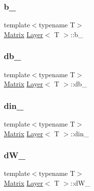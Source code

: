 \subsubsection{\texorpdfstring{b\_}{b\_}}
{\footnotesize\ttfamily template$<$typename T$>$ \\
\mbox{\hyperlink{class_layer_a22b1e7286096aa62bd245536c8ebdaf1}{Matrix}} \mbox{\hyperlink{class_layer}{Layer}}$<$ T $>$\+::b\+\_\+\hspace{0.3cm}{\ttfamily [protected]}}

\mbox{\label{class_layer_a4ff69fa1c45333cbef24f12d190f26a5}} 
\subsubsection{\texorpdfstring{db\_}{db\_}}
{\footnotesize\ttfamily template$<$typename T$>$ \\
\mbox{\hyperlink{class_layer_a22b1e7286096aa62bd245536c8ebdaf1}{Matrix}} \mbox{\hyperlink{class_layer}{Layer}}$<$ T $>$\+::db\+\_\+\hspace{0.3cm}{\ttfamily [protected]}}

\mbox{\label{class_layer_adcac12db650e05e0e5c664c304231604}} 
\subsubsection{\texorpdfstring{din\_}{din\_}}
{\footnotesize\ttfamily template$<$typename T$>$ \\
\mbox{\hyperlink{class_layer_a22b1e7286096aa62bd245536c8ebdaf1}{Matrix}} \mbox{\hyperlink{class_layer}{Layer}}$<$ T $>$\+::din\+\_\+\hspace{0.3cm}{\ttfamily [protected]}}

\mbox{\label{class_layer_ab02d1e3e853bef3aadffc312ba847f44}} 
\subsubsection{\texorpdfstring{dW\_}{dW\_}}
{\footnotesize\ttfamily template$<$typename T$>$ \\
\mbox{\hyperlink{class_layer_a22b1e7286096aa62bd245536c8ebdaf1}{Matrix}} \mbox{\hyperlink{class_layer}{Layer}}$<$ T $>$\+::d\+W\+\_\+\hspace{0.3cm}{\ttfamily [protected]}}

